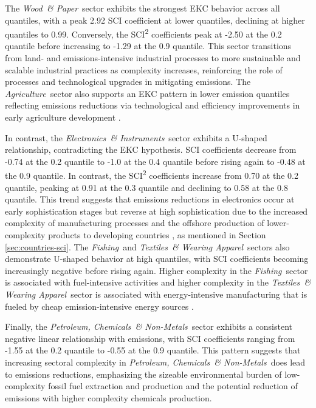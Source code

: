 \documentclass[10pt]{article}
\newcommand{\AG}{\textit{Agriculture}}
\newcommand{\EL}{\textit{Electronics~\& Instruments}}
\newcommand{\FI}{\textit{Fishing}}
\newcommand{\PE}{\textit{Petroleum, Chemicals~\& Non-Metals}}
\newcommand{\TE}{\textit{Textiles~\& Wearing Apparel}}
\newcommand{\WO}{\textit{Wood~\& Paper}}
\begin{document}
The \WO\ sector exhibits the strongest EKC behavior across all quantiles, with a peak 2.92 SCI coefficient at lower quantiles, declining at higher quantiles to 0.99. Conversely, the SCI\textsuperscript{2} coefficients peak at -2.50 at the 0.2 quantile before increasing to -1.29 at the 0.9 quantile. This sector transitions from land- and emissions-intensive industrial processes to more sustainable and scalable industrial practices as complexity increases, reinforcing the role of processes and technological upgrades in mitigating emissions. The \AG\ sector also supports an EKC pattern in lower emission quantiles reflecting emissions reductions via technological and efficiency improvements in early agriculture development \citep{AgricultureEnvironment}.

In contrast, the \EL\ sector exhibits a U-shaped relationship, contradicting the EKC hypothesis. SCI coefficients decrease from -0.74 at the 0.2 quantile to -1.0 at the 0.4 quantile before rising again to -0.48 at the 0.9 quantile. In contrast, the SCI\textsuperscript{2} coefficients increase from 0.70 at the 0.2 quantile, peaking at 0.91 at the 0.3 quantile and declining to 0.58 at the 0.8 quantile. This trend suggests that emissions reductions in electronics occur at early sophistication stages but reverse at high sophistication due to the increased complexity of manufacturing processes and the offshore production of lower-complexity products to developing countries \citep{ElectronicsOffshore}, as mentioned in Section \ref{sec:countries-sci}. The \FI\ and \TE\ sectors also demonstrate U-shaped behavior at high quantiles, with SCI coefficients becoming increasingly negative before rising again. Higher complexity in the \FI\ sector is associated with fuel-intensive activities \citep{parkerFuelUseGreenhouse2018, salaEnergyAuditCarbon2022} and higher complexity in the \TE\ sector is associated with energy-intensive manufacturing that is fueled by cheap emission-intensive energy sources \citep{textilesenvironmental}.

Finally, the \PE\ sector exhibits a consistent negative linear relationship with emissions, with SCI coefficients ranging from -1.55 at the 0.2 quantile to -0.55 at the 0.9 quantile. This pattern suggests that increasing sectoral complexity in \PE\ does lead to emissions reductions, emphasizing the sizeable environmental burden of low-complexity fossil fuel extraction and production and the potential reduction of emissions with higher complexity chemicals production.
\end{document}
